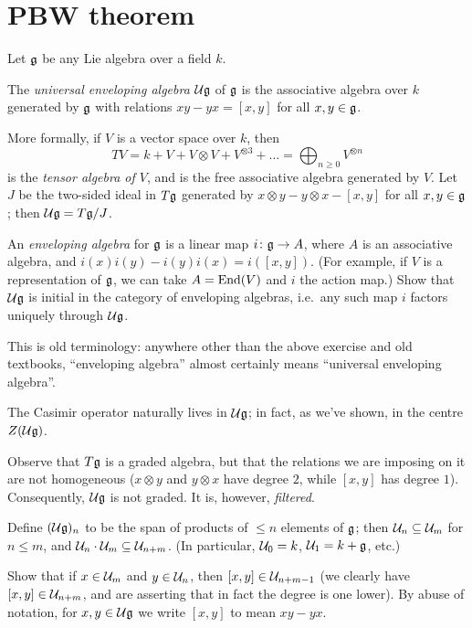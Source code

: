 \section{PBW theorem}

Let $\mathfrak{g}$ be any Lie algebra over a field $k$.

\begin{definition}
The \emph{universal enveloping algebra} $\mathcal{U}\mathfrak{g}$ of $\mathfrak{g}$ is the associative
algebra over $k$ generated by $\mathfrak{g}$ with relations $xy - yx = [x, y]$ for all
$x, y \in \mathfrak{g}$.
\end{definition}

More formally, if $V$ is a vector space over $k$, then
\[
  TV = k + V + V \otimes V + V^{\otimes 3} + \dots = \bigoplus_{n \geq 0} V^{\otimes n}
\]
is the \emph{tensor algebra of $V$}, and is the free associative algebra
generated by $V$. Let $J$ be the two-sided ideal in $T\mathfrak{g}$ generated by
$x \otimes y - y \otimes x - [x, y]$ for all $x, y \in \mathfrak{g}$; then
$\mathcal{U}\mathfrak{g} = T\mathfrak{g}/J$.

\begin{exercise}
An \emph{enveloping algebra} for $\mathfrak{g}$ is a linear map $i\colon \mathfrak{g} \to A$, where
$A$ is an associative algebra, and $i(x)i(y) - i(y)i(x) = i([x, y])$. (For
example, if $V$ is a representation of $\mathfrak{g}$, we can take $A = \operatorname{End}(V)$ and $i$
the action map.) Show that $\mathcal{U}\mathfrak{g}$ is initial in the category of enveloping
algebras, i.e.\ any such map $i$ factors uniquely through $\mathcal{U}\mathfrak{g}$.
\end{exercise}

\begin{remark}
This is old terminology: anywhere other than the above exercise and old
textbooks, ``enveloping algebra'' almost certainly means ``universal
enveloping algebra''.
\end{remark}

The Casimir operator naturally lives in $\mathcal{U}\mathfrak{g}$; in fact, as we've shown, in
the centre $Z(\mathcal{U}\mathfrak{g})$.

Observe that $T\mathfrak{g}$ is a graded algebra, but that the relations we are imposing
on it are not homogeneous ($x \otimes y$ and $y \otimes x$ have degree $2$,
while $[x, y]$ has degree $1$). Consequently, $\mathcal{U}\mathfrak{g}$ is not graded. It is,
however, \emph{filtered}.

Define $(\mathcal{U}\mathfrak{g})_n$ to be the span of products of $\leq n$ elements of $\mathfrak{g}$;
then $\mathcal{U}_n \subseteq \mathcal{U}_m$ for $n \leq m$, and
$\mathcal{U}_n \cdot \mathcal{U}_m \subseteq \mathcal{U}_{n+m}$. (In particular, $\mathcal{U}_0 = k$,
$\mathcal{U}_1 = k + \mathfrak{g}$, etc.)

\begin{exercise}
Show that if $x \in \mathcal{U}_m$ and $y \in \mathcal{U}_n$, then $[x, y] \in \mathcal{U}_{n+m-1}$ (we
clearly have $[x, y] \in \mathcal{U}_{n+m}$, and are asserting that in fact the degree
is one lower). By abuse of notation, for $x, y \in \mathcal{U}\mathfrak{g}$ we write $[x, y]$ to
mean $xy - yx$.
\end{exercise}

